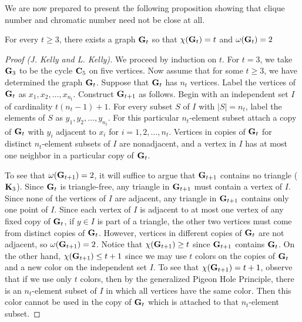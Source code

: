 We are now prepared to present the following proposition showing that
clique number and chromatic number need not be close at all.

\begin{proposition}\label{prop:triangle-free}
  For every $t\ge3$, there exists a graph $\mathbf{G}_t$ so that
  $\chi(\mathbf{G}_t)=t$ and $\omega(\mathbf{G}_t)=2$
\end{proposition}

\begin{proof}[Proof (J. Kelly and L. Kelly)]
  We proceed by induction on $t$. For $t=3$, we take $\mathbf{G}_3$ to be
  the cycle $\mathbf{C}_5$ on five vertices.  Now assume that for some
  $t\ge3$, we have determined the graph $\mathbf{G}_t$.  Suppose that
  $\mathbf{G}_t$ has $n_t$ vertices.  Label the vertices of $\mathbf{G}_t$ as
  $x_1,x_2,\dots,x_{n_t}$.  Construct $\mathbf{G}_{t+1}$ as follows.  Begin
  with an independent set $I$ of cardinality $t(n_t-1)+1$.  For every
  subset $S$ of $I$ with $|S|=n_t$, label the elements of $S$ as
  $y_1,y_2,\dots,y_{n_t}$.  For this particular $n_t$-element subset
  attach a copy of $\mathbf{G}_t$ with $y_i$ adjacent to $x_i$ for
  $i=1,2,\dots,n_t$.  Vertices in copies of $\mathbf{G}_t$ for distinct
  $n_t$-element subsets of $I$ are nonadjacent, and a vertex in $I$
  has at most one neighbor in a particular copy of $\mathbf{G}_t$.

  To see that $\omega(\mathbf{G}_{t+1})=2$, it will suffice to argue that
  $\mathbf{G}_{t+1}$ contains no triangle ($\mathbf{K}_3$).  Since $\mathbf{G}_t$ is
  triangle-free, any triangle in $\mathbf{G}_{t+1}$ must contain a vertex of
  $I$. Since none of the vertices of $I$ are adjacent, any triangle in
  $\mathbf{G}_{t+1}$ contains only one point of $I$. Since each vertex of
  $I$ is adjacent to at most one vertex of any fixed copy of $\mathbf{G}_t$,
  if $y\in I$ is part of a triangle, the other two vertices must come
  from distinct copies of $\mathbf{G}_t$. However, vertices in different
  copies of $\mathbf{G}_t$ are not adjacent, so
  $\omega(\mathbf{G}_{t+1})=2$. Notice that $\chi(\mathbf{G}_{t+1})\ge t$ since
  $\mathbf{G}_{t+1}$ contains $\mathbf{G}_t$.  On the other hand,
  $\chi(\mathbf{G}_{t+1})\le t+1$ since we may use $t$ colors on the copies
  of $\mathbf{G}_t$ and a new color on the independent set $I$.  To see that
  $\chi(\mathbf{G}_{t+1})=t+1$, observe that if we use only $t$ colors, then
  by the generalized Pigeon Hole Principle, there is an $n_t$-element
  subset of $I$ in which all vertices have the same color.  Then this
  color cannot be used in the copy of $\mathbf{G}_t$ which is attached to
  that $n_t$-element subset.
\end{proof}


